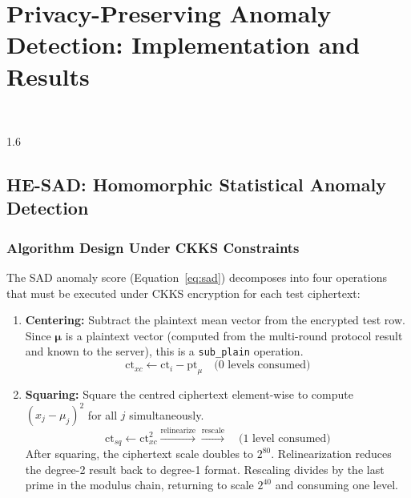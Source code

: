 \chapter{Privacy-Preserving Anomaly Detection: Implementation and Results}
\HRule\\[2cm]
\label{Chapter5}

\begin{spacing}{1.6}

\section{HE-SAD: Homomorphic Statistical Anomaly Detection}

\subsection{Algorithm Design Under CKKS Constraints}

The SAD anomaly score (Equation~\ref{eq:sad}) decomposes into four operations
that must be executed under CKKS encryption for each test ciphertext:

\begin{enumerate}
  \item \textbf{Centering:} Subtract the plaintext mean vector from the
  encrypted test row. Since $\boldsymbol{\mu}$ is a plaintext vector (computed
  from the multi-round protocol result and known to the server), this is a
  \texttt{sub\_plain} operation.
  \begin{equation}
    \mathrm{ct}_{xc} \leftarrow \mathrm{ct}_i - \mathrm{pt}_\mu
    \quad \text{(0 levels consumed)}
  \end{equation}

  \item \textbf{Squaring:} Square the centred ciphertext element-wise to
  compute $(x_j - \mu_j)^2$ for all $j$ simultaneously.
  \begin{equation}
    \mathrm{ct}_{sq} \leftarrow \mathrm{ct}_{xc}^2
    \xrightarrow{\text{relinearize}} \xrightarrow{\text{rescale}}
    \quad \text{(1 level consumed)}
  \end{equation}
  After squaring, the ciphertext scale doubles to $2^{80}$. Relinearization
  reduces the degree-2 result back to degree-1 format. Rescaling divides by
  the last prime in the modulus chain, returning to scale $2^{40}$ and
  consuming one level.


\end{enumerate}
\end{spacing}
